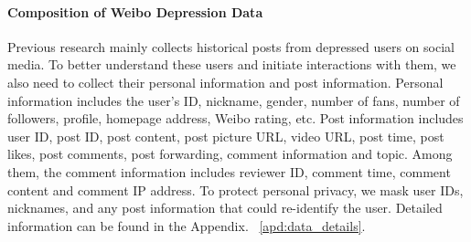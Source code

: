 \paragraph{Composition of Weibo Depression Data}
Previous research mainly collects historical posts from depressed users on social media. To better understand these users and initiate interactions with them, we also need to collect their personal information and post information. 
Personal information includes the user's ID, nickname, gender, number of fans, number of followers, profile, homepage address, Weibo rating, etc.
Post information includes user ID, post ID, post content, post picture URL, video URL, post time, post likes, post comments, post forwarding, comment information and topic. Among them, the comment information includes reviewer ID, comment time, comment content and comment IP address. To protect personal privacy, we mask user IDs, nicknames, and any post information that could re-identify the user. Detailed information can be found in the Appendix. ~\ref{apd:data_details}.

